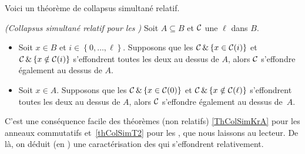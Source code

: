 Voici un théorème de collapsus simultané relatif.
\begin{theorem} 
\label{thColSimRel} {\em (Collapsus simultané relatif pour les \procs)} 
Soit $A\subseteq B$  et ${\cal C}$ une \prolo $\ell$ 
dans $B$. 
\begin{itemize}
\item [$(1)$] Soit $x\in B$ et $i\in\left\{0,\ldots ,\ell\right\}$.
Supposons que les \procs 
${\cal C}\,\& \left\{x\in {\cal C}(i) \right\} $
\hbox{et ${\cal C}\,\& \left\{x\notin {\cal C}(i) \right\} $}
s'effondrent toutes les deux au dessus de $A$, alors ${\cal C}$ s'effondre 
également au dessus de $A$.
\item [$(2)$] Soit $x\in A$. Supposons que les \procs 
${\cal C}\,\& \left\{x\in {\cal C}(0) \right\} $
et 
${\cal C}\,\& \left\{x\notin {\cal C}(\ell) \right\} $
s'effondrent toutes les deux au dessus de $A$, alors ${\cal C}$ s'effondre 
également au dessus de~$A$.
\end{itemize}
\end{theorem}
C'est une conséquence facile des théorèmes (non relatifs) 
\ref{ThColSimKrA} pour les anneaux commutatifs et~\ref{thColSimT2} pour les \trdis, que nous laissons au lecteur.
De là, on déduit (en \clama) une caractérisation des \procs qui 
s'effondrent relativement.
 
